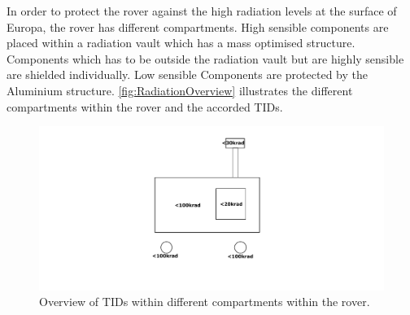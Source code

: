 \label{subsec:RadiationConclusion}

In order to protect the rover against the high radiation levels at the surface of Europa, the rover has different compartments. High sensible components are placed within a radiation vault which has a mass optimised structure. Components which has to be outside the radiation vault but are highly sensible are shielded individually. Low sensible Components are protected by the Aluminium structure. \autoref{fig:RadiationOverview} illustrates the different compartments within the rover and the accorded TIDs.

\begin{figure}[htb]
     \centering
     \includegraphics[width=\textwidth]{Media/RadiationOverview}
     \caption{Overview of TIDs within different compartments within the rover.}
     \label{fig:RadiationOverview}
\end{figure}

\cleardoublepage